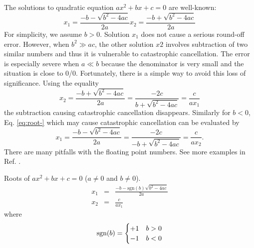 \bigskip
\begin{example}
	The solutions to quadratic equation $a x^2 + b x + c = 0$ are well-known:
	\begin{subequations}\label{eq:roots-original}
		\begin{equation}
		x_1 = \frac{-b - \sqrt{b^2 - 4 a c}}{2a} \label{eq:root-}
		\end{equation}
		\begin{equation}
		x_2 = \frac{-b + \sqrt{b^2 - 4 a c}}{2a}\label{eq:root+}
		\end{equation}
	\end{subequations}
	For simplicity, we assume $b>0$.
	Solution $x_1$ does not cause a serious round-off error. However, when $b^2 \gg a c$, the other solution  $x2$  involves subtraction of two similar numbers and thus it is vulnerable to catastrophic cancellation. The error is especially severe when $a \ll b$ because the denominator is very small and the situation is close to 0/0. Fortunately, there is a simple way to avoid this loss of significance. Using the equality
	\begin{equation}
	x_2 = \frac{-b + \sqrt{b^2 - 4 a c}}{2a} = \frac{-2c}{b+\sqrt{b^2 - 4 a c}} = \frac{c}{a x_1}
	\label{eq:quad_trick1}
	\end{equation}
	the subtraction causing catastrophic cancellation disappears.  Similarly for $b<0$, Eq. \eqref{eq:root-} which may cause catastrophic cancellation can be evaluated by 
	\begin{equation}
	x_1 = \frac{-b - \sqrt{b^2 - 4 a c}}{2a} = \frac{-2c}{-b+\sqrt{b^2 - 4 a c}} = \frac{c}{a x_2}.
	\label{eq:quad_trick2}
	\end{equation}
	There are many pitfalls with the floating point numbers.  See more examples in Ref. \cite{Goldberg1991}.
	
\bigskip
\begin{myalgobox}
	\label{algo:roots-quad}

\bigskip
Roots of $a x^2 + b x + c = 0$ ($a \ne 0$ and $b \ne 0$).
\begin{eqnarray}
x_1 &=& \frac{-b - \text{sgn}(b)\sqrt{b^2 - 4 a c}}{2a} \\
x_2 &=& \frac{c}{a x_1}
\end{eqnarray}
where
\[
\operatorname{sgn}(b) = \begin{cases} +1 & b>0 \\ -1 & b<0 \end{cases}
\]
\end{myalgobox}

\end{example}

